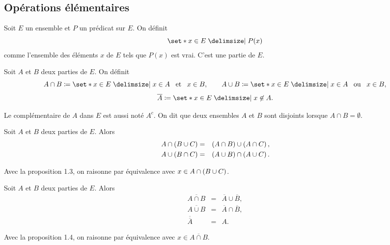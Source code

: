 \documentclass{magnolia}
\begin{document}
\subsection{Opérations élémentaires}

\begin{definition}[utile=-3]
Soit $E$ un ensemble et $P$ un prédicat sur $E$. On définit
\[\enstq{x\in E}{P(x)}\]
comme l'ensemble des éléments $x$ de $E$ tels que $P(x)$ est vrai. C'est une partie
de $E$.
\end{definition}

\begin{definition}[utile=-3]
Soit $A$ et $B$ deux parties de $E$. On définit
\[A\cap B\defeq\enstq{x\in E}{x\in A \et x\in B}, \qquad
  A\cup B\defeq\enstq{x\in E}{x\in A \ou x\in B},\]
\[\overline{A}\defeq\enstq{x\in E}{x\not\in A}.\]
\end{definition}

\begin{remarques}
\remarque Le complémentaire de $A$ dans $E$ est aussi noté $A^c$.
\remarque On dit que deux ensembles $A$ et $B$ sont disjoints lorsque
  $A\cap B=\emptyset$.
\end{remarques}

\begin{proposition}[utile=-3]
Soit $A$ et $B$ deux parties de $E$. Alors
\begin{eqnarray*}
A\cap\left(B\cup C\right)&=&\left(A\cap B\right)\cup\left(A\cap C\right),\\
A\cup\left(B\cap C\right)&=&\left(A\cup B\right)\cap\left(A\cup C\right).
\end{eqnarray*}
\end{proposition}

\begin{preuve}
Avec la proposition 1.3, on raisonne par équivalence avec $x\in A\cap\left(B\cup C\right)$.
\end{preuve}

\begin{proposition}[utile=-3, nom={Lois de \nom{Morgan}}]
Soit $A$ et $B$ deux parties de $E$. Alors
\begin{eqnarray*}
\overline{A\cap B}&=&\overline{A}\cup \overline{B},\\
\overline{A\cup B}&=&\overline{A}\cap \overline{B},\\
\overline{\overline{A}}&=&A.
\end{eqnarray*}
\end{proposition}

\begin{preuve}
Avec la proposition 1.4, on raisonne par équivalence avec $x\in \overline{A\cap B}$.
\end{preuve}
\end{document}
